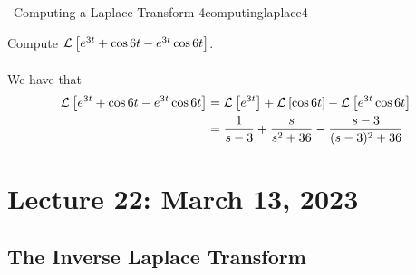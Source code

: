         \begin{example}{\Difficulty\,\Difficulty\,\,Computing a Laplace Transform 4}{computinglaplace4}
            
            Compute \(\mathcal{L}^{}\left[e^{3t}+\cos 6t-e^{3t}\cos 6t\right]\).
            \\
            \\
            We have that
            \begin{align*}
                \mathcal{L}^{}\left[e^{3t}+\cos 6t-e^{3t}\cos 6t\right]&=\mathcal{L}^{}\left[e^{3t}\right]+\mathcal{L}^{}\left[\cos 6t\right]-\mathcal{L}^{}\left[e^{3t}\cos 6t\right] \\
                &=\frac{1}{s-3}+\frac{s}{s^2+36}-\frac{s-3}{(s-3)^2+36}
            \end{align*}

        \end{example}

\pagebreak
    
\section{Lecture 22: March 13, 2023}

    \subsection{The Inverse Laplace Transform}

